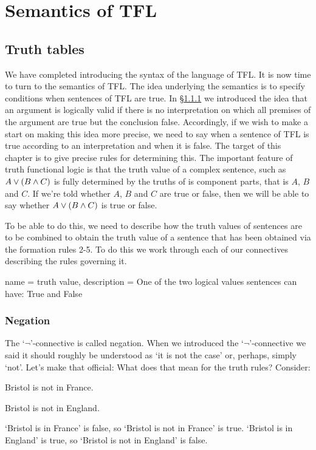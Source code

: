 \chapter{Semantics of TFL}
\section{Truth tables}\label{sec:tt}
We have completed introducing the syntax of the language of TFL. It is now time to turn to the semantics of TFL. The idea underlying the semantics is to specify conditions when sentences of TFL are true. In \S\ref{} we introduced the idea that an argument is logically valid if there is no interpretation on which all premises of the argument are true but the conclusion false. Accordingly, if we wish to make a start on making this idea more precise, we need to say when a sentence of TFL is true according to an interpretation and when it is false. The target of this chapter is to give precise rules for determining this. The important feature of truth functional logic is that the truth value of a complex sentence, such as $A\vee(B\mathbin{\wedge} C)$ is fully determined by the truths of is component parts, that is $A$, $B$ and $C$. If we're told whether $A$, $B$ and $C$ are true or false, then we will be able to say whether $A\vee(B\mathbin{\wedge} C)$ is true or false.

To be able to do this, we need to describe how the truth values of sentences are to be combined to obtain the truth value of a sentence that has been obtained via the formation rules 2-5. To do this we work through each of our connectives describing the rules governing it.

                 {
                   name = truth value,
                   description = {One of the two logical values sentences can have: True and False}
                   }


\subsection{Negation}
The `$\neg$'-connective is called negation. When we introduced the `$\neg$'-connective we said it should roughly be understood as `it is not the case' or, perhaps, simply `not'. Let's make that official:
What does that mean for the truth rules? Consider:
\begin{earg}
\item[\ex{neg-f}] Bristol is not in France.
\item[\ex{neg-f}] Bristol is not in England.
\end{earg}
`Bristol is in France' is false, so `Bristol is not in France' is true.
`Bristol is in England' is true, so `Bristol is not in England' is false.

